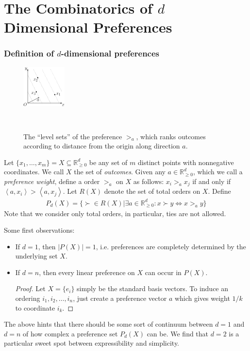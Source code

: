 \documentclass[12pt]{article}
\newcommand{\Rgz}{\mathbb{R}_{\ge 0}}
\newcommand{\ip}[2]{\left\langle{#1},{#2}\right\rangle}
\newcommand{\1}[1]{\mathds{1}[{#1}]}
\begin{document}
\clearpage
\part{The Combinatorics of $d$ Dimensional Preferences}

\section{Definition of $d$-dimensional preferences}
  \begin{figure}
    \vspace{-0.7in}
    \begin{center}
      \includegraphics[width=0.2\textwidth]{figures/def2DPref}
    \end{center}
    \ \caption{
      The ``level sets'' of the preference $>_a$,
      which ranks outcomes according to distance from the origin along
      direction $a$.
    }
  \end{figure}
  Let $\{x_1,\ldots,x_m\} = X\subseteq \Rgz^d$ be any set of
  $m$ distinct points with nonnegative coordinates.
  We call $X$ the set of \emph{outcomes}.
  Given any $a\in \Rgz^d$, which we call a \emph{preference weight},
  define a order $>_a$ on $X$ as follows:
  $x_i >_a x_j$ if and only if $\ip{a}{x_i} > \ip{a}{x_j}$.
  Let $R(X)$ denote the set of total orders on $X$.
  Define
  \begin{align*}
    P_d(X) = \{ \succ \in R(X) | \exists a\in\Rgz^d: x \succ y \iff x >_a y\}
  \end{align*}
  Note that we consider only total orders, in particular,
  ties are not allowed.

  Some first observations:
  \begin{itemize}
    \item If $d=1$, then $|P(X)| = 1$, i.e. preferences are completely
      determined by the underlying set $X$.
    \item If $d=n$, then every linear preference on $X$ can occur in $P(X)$.
      \begin{proof}
        Let $X = \{e_i\}$ simply be the standard basis vectors.
        To induce an ordering $i_1, i_2, \ldots, i_n$, just create a preference
        vector $a$ which gives weight $1/k$ to coordinate $i_k$.
      \end{proof}
  \end{itemize}
  The above hints that there should be some sort of continuum between $d=1$
  and $d=n$ of how complex a preference set $P_d(X)$ can be.
  We find that $d=2$ is a particular sweet spot between expressibility and
  simplicity.
\end{document}
